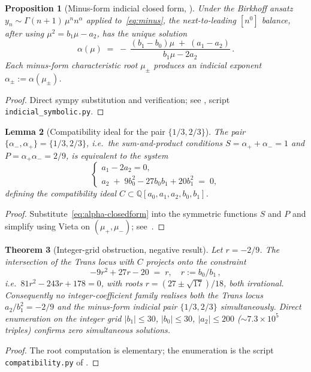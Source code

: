 \documentclass[11pt]{amsart}
\newtheorem{theorem}{Theorem}[section]
\newtheorem{proposition}[theorem]{Proposition}
\newtheorem{lemma}[theorem]{Lemma}
\theoremstyle{definition}
\theoremstyle{remark}
\newcommand{\Q}{\mathbb{Q}}
\begin{document}
\begin{proposition}[Minus-form indicial closed form,
\cite{SprintW1Report}]
\label{prop:minus-indicial}
Under the Birkhoff ansatz $y_n \sim \Gamma(n+1)\,\mu^n n^\alpha$
applied to~\eqref{eq:minus}, the next-to-leading $[n^0]$ balance,
after using $\mu^2 = b_1\mu - a_2$, has the unique solution
\begin{equation}\label{eq:alpha-closedform}
  \alpha(\mu) \;=\; -\,\frac{(b_1 - b_0)\mu \;+\; (a_1 - a_2)}%
                            {b_1\mu - 2 a_2}\,.
\end{equation}
Each minus-form characteristic root $\mu_\pm$ produces an indicial
exponent $\alpha_\pm := \alpha(\mu_\pm)$.
\end{proposition}
\begin{proof}
Direct sympy substitution and verification; see
\cite[]{SprintW1Report}, script
\texttt{indicial\_symbolic.py}.
\end{proof}

\begin{lemma}[Compatibility ideal for the pair $\{1/3,2/3\}$]
\label{lem:compat-ideal}
The pair $\{\alpha_-,\alpha_+\} = \{1/3,2/3\}$, i.e.\ the
sum-and-product conditions $S = \alpha_++\alpha_- = 1$ and $P =
\alpha_+\alpha_- = 2/9$, is equivalent to the system
\[
  \begin{cases}
    a_1 - 2 a_2 = 0,\\
    a_2 \;+\; 9 b_0^2 - 27 b_0 b_1 + 20 b_1^2 \;=\; 0,
  \end{cases}
\]
defining the compatibility ideal $C \subset
\Q[a_0,a_1,a_2,b_0,b_1]$.
\end{lemma}
\begin{proof}
Substitute~\eqref{eq:alpha-closedform} into the symmetric functions
$S$ and $P$ and simplify using Vieta on $(\mu_+,\mu_-)$;
see~\cite[]{SprintW1Report}.
\end{proof}

\begin{theorem}[Integer-grid obstruction, negative result]
\label{thm:integer-obstruction}
Let $r = -2/9$.  The intersection of the Trans locus with $C$
projects onto the constraint
\[
  -9 r^2 + 27 r - 20 \;=\; r,
  \quad r:=b_0/b_1\,,
\]
i.e.\ $81 r^2 - 243 r + 178 = 0$, with roots
$r = (27 \pm \sqrt{17})/18$, both irrational.  Consequently no
integer-coefficient family realises both the Trans locus
$a_2/b_1^2 = -2/9$ and the minus-form indicial pair $\{1/3,2/3\}$
simultaneously.  Direct enumeration on the integer grid
$|b_1|\le 30$, $|b_0|\le 30$, $|a_2|\le 200$
($\sim 7.3\times 10^5$ triples) confirms zero simultaneous
solutions.
\end{theorem}
\begin{proof}
The root computation is elementary; the enumeration is the script
\texttt{compatibility.py} of \cite{SprintW1Report}.
\end{proof}
\end{document}
